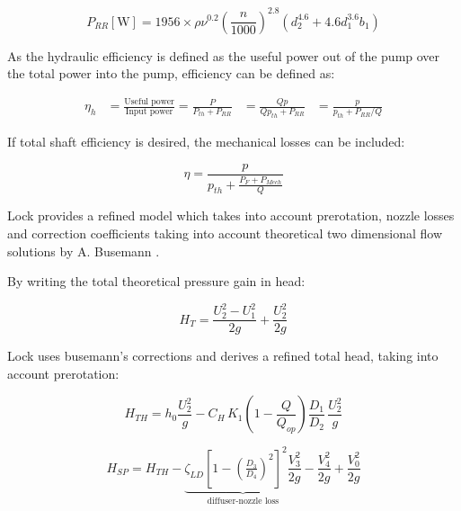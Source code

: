 \begin{equation}
    P_{RR} [\mathrm{W}] = 1956\times\rho\nu^{0.2}\left(\frac{n}{1000}\right)^{2.8}\left(d_2^{4.6}+4.6d_1^{3.6}b_1\right)
\end{equation}

As the hydraulic efficiency is defined as the useful power out of the pump over the total power into the pump, efficiency can be defined as:

\begin{align}
\eta_h & = \frac{\text{Useful power}}{\text{Input power}} = \frac{P}{P_{th}+P_{RR}}
 & = \frac{Qp}{Qp_{th}+P_{RR}}
 & = \frac{p}{p_{th}+P_{RR}/Q}
\end{align}

If total shaft efficiency is desired, the mechanical losses can be included:

\begin{equation}
    \eta=\frac{p}{p_{th}+\frac{P_F+P_{Mech}}{Q}}
\end{equation}

Lock provides a refined model which takes into account prerotation, nozzle losses and correction coefficients taking into account theoretical two dimensional flow solutions by A. Busemann \cite{buseman}. 


By writing the total theoretical pressure gain in head:

\begin{equation}
    H_T = \frac{U_2^2 - U_1^2}{2g} + \frac{U_2^2}{2g}
\end{equation}

Lock uses busemann's corrections and derives a refined total head, taking into account prerotation:

\begin{equation}
    H_{TH} = h_0\frac{U_2^2}{g} - C_H\,K_1\!\left(1-\frac{Q}{Q_{op}}\right)\!\frac{D_1}{D_2}\,\frac{U_2^2}{g}
    \label{eq:lock_total_head}
\end{equation}

\begin{equation}
H_{SP} = H_{TH} - \underbrace{\zeta_{LD}\left[1-\left(\tfrac{D_3}{D_4}\right)^2\right]^2\frac{V_3^2}{2g}}_{\text{diffuser-nozzle loss}} - \frac{V_4^2}{2g} + \frac{V_0^2}{2g}
\label{eq:lock_static_head}
\end{equation}

